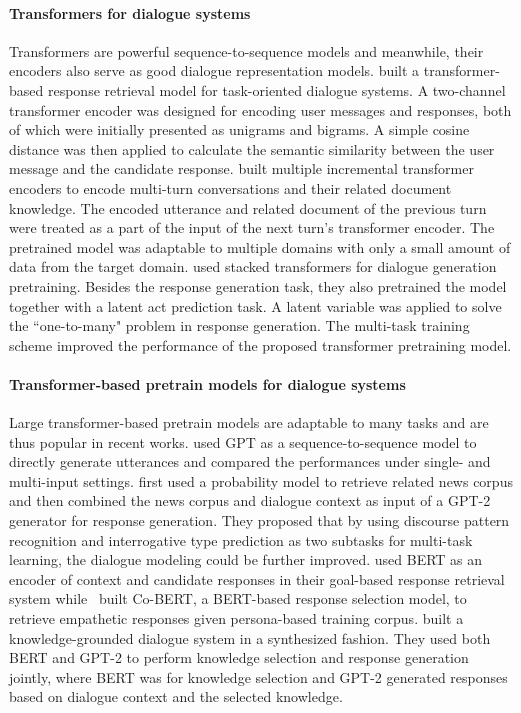 \paragraph*{Transformers for dialogue systems} Transformers are powerful sequence-to-sequence models and meanwhile, their encoders also serve as good dialogue representation models.  built a transformer-based response retrieval model for task-oriented dialogue systems. A two-channel transformer encoder was designed for encoding user messages and responses, both of which were initially presented as unigrams and bigrams. A simple cosine distance was then applied to calculate the semantic similarity between the user message and the candidate response.  built multiple incremental transformer encoders to encode multi-turn conversations and their related document knowledge. The encoded utterance and related document of the previous turn were treated as a part of the input of the next turn's transformer encoder. The pretrained model was adaptable to multiple domains with only a small amount of data from the target domain.  used stacked transformers for dialogue generation pretraining. Besides the response generation task, they also pretrained the model together with a latent act prediction task. A latent variable was applied to solve the ``one-to-many" problem in response generation. The multi-task training scheme improved the performance of the proposed transformer pretraining model.  
\paragraph*{Transformer-based pretrain models for dialogue systems} Large transformer-based pretrain models are adaptable to many tasks and are thus popular in recent works.  used GPT as a sequence-to-sequence model to directly generate utterances and compared the performances under single- and multi-input settings.  first used a probability model to retrieve related news corpus and then combined the news corpus and dialogue context as input of a GPT-2 generator for response generation. They proposed that by using discourse pattern recognition and interrogative type prediction as two subtasks for multi-task learning, the dialogue modeling could be further improved.  used BERT as an encoder of context and candidate responses in their goal-based response retrieval system while~ built Co-BERT, a BERT-based response selection model, to retrieve empathetic responses given persona-based training corpus.  built a knowledge-grounded dialogue system in a synthesized fashion. They used both BERT and GPT-2 to perform knowledge selection and response generation jointly, where BERT was for knowledge selection and GPT-2 generated responses based on dialogue context and the selected knowledge.

